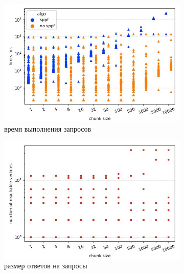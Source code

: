 \documentclass[14pt]{matmex-diploma-custom}
\theoremstyle{definition}
\begin{document}
\begin{figure}[H]
    \begin{center}
    \begin{subfigure}[b]{0.8\textwidth}
    \centering
    \includegraphics[width=\textwidth]{pics/geospecies_sppf_st.pdf_1.jpg} \caption{время выполнения запросов}
    \label{fig:subim1}
    \end{subfigure}%
    \end{center}
    \begin{subfigure}[b]{0.5\textwidth}
    \centering
    \includegraphics[width=\textwidth]{pics/geospecies_ans_st.pdf_1.jpg} \caption{размер ответов на запросы}
    \label{fig:subim2}
    \end{subfigure}         \begin{subfigure}[b]{0.5\textwidth}
    \centering

\end{subfigure}
\end{figure}
\end{document}
